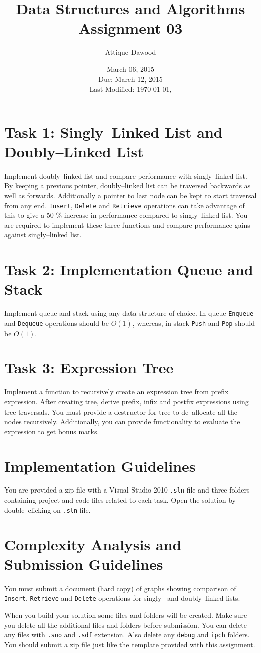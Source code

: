 \documentclass[12pt,a4paper]{article}
\title{Data Structures and Algorithms\\Assignment 03}
\author{Attique Dawood}
\date{March 06, 2015\\Due: March 12, 2015\\[0.2cm] Last Modified: \today, \currenttime}
\begin{document}
\maketitle
\section{Task 1: Singly--Linked List and Doubly--Linked List}
Implement doubly--linked list and compare performance with singly--linked list. By keeping a previous pointer, doubly--linked list can be traversed backwards as well as forwards. Additionally a pointer to last node can be kept to start traversal from any end. \verb|Insert|, \verb|Delete| and \verb|Retrieve| operations can take advantage of this to give a 50 \% increase in performance compared to singly--linked list. You are required to implement these three functions and compare performance gains against singly--linked list.
\section{Task 2: Implementation Queue and Stack}
Implement queue and stack using any data structure of choice. In queue \verb|Enqueue| and \verb|Dequeue| operations should be $O(1)$, whereas, in stack \verb|Push| and \verb|Pop| should be $O(1)$.
\section{Task 3: Expression Tree}
Implement a function to recursively create an expression tree from prefix expression. After creating tree, derive prefix, infix and postfix expressions using tree traversals. You must provide a destructor for tree to de--allocate all the nodes recursively. Additionally, you can provide functionality to evaluate the expression to get bonus marks.
\section{Implementation Guidelines}
You are provided a zip file with a Visual Studio 2010 \verb|.sln| file and three folders containing project and code files related to each task. Open the solution by double--clicking on \verb|.sln| file. 
\section{Complexity Analysis and Submission Guidelines}
You must submit a document (hard copy) of graphs showing comparison of \verb|Insert|, \verb|Retrieve| and \verb|Delete| operations for singly-- and doubly--linked lists.

When you build your solution some files and folders will be created. Make sure you delete all the additional files and folders before submission. You can delete any files with \verb|.suo| and \verb|.sdf| extension. Also delete any \verb|debug| and \verb|ipch| folders. You should submit a zip file just like the template provided with this assignment.
\end{document}
